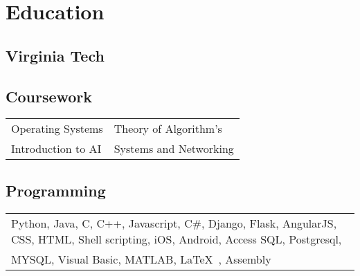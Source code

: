 \documentclass[]{mdavoodi-resume-openfont}
\begin{document}
%
%
\lastupdated

%
%






\section{Education} 

\begin{minipage}[t]{0.50\textwidth} 
\subsection{Virginia Tech}
\sectionsep
\end{minipage}
\begin{minipage}[t]{0.49\textwidth} 
\subsection{Coursework}
\begin{tabular}{l|l}
Operating Systems & Theory of Algorithm’s\\
Introduction to AI & Systems and Networking\\
\end{tabular}
\sectionsep
\end{minipage}

\subsection{Programming}
\begin{tabular}{l}
Python, Java, C, C++, Javascript, C\#, Django, Flask, AngularJS, CSS, HTML, Shell scripting, iOS, Android, Access SQL, Postgresql, \\
MYSQL, Visual Basic, MATLAB, \LaTeX\ , Assembly
\end{tabular}
\end{document}
